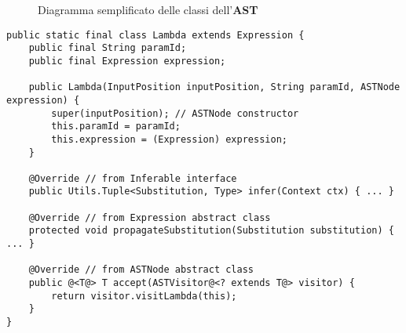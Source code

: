 \begin{figure}
    \caption{Diagramma semplificato delle classi dell'\textbf{AST}}
    \label{fig:5-5-ast-classes}
    \vspace{4mm}
\end{figure}

\begin{lstlisting}[caption={Esempio di classe della gerarchia}, style=javaCode, label={lst:5-5-ast-class-java}]
public static final class Lambda extends Expression {
    public final String paramId;
    public final Expression expression;

    public Lambda(InputPosition inputPosition, String paramId, ASTNode expression) {
        super(inputPosition); // ASTNode constructor
        this.paramId = paramId;
        this.expression = (Expression) expression;
    }

    @Override // from Inferable interface
    public Utils.Tuple<Substitution, Type> infer(Context ctx) { ... }

    @Override // from Expression abstract class
    protected void propagateSubstitution(Substitution substitution) { ... }

    @Override // from ASTNode abstract class
    public @<T@> T accept(ASTVisitor@<? extends T@> visitor) {
        return visitor.visitLambda(this);
    }
}
\end{lstlisting}

